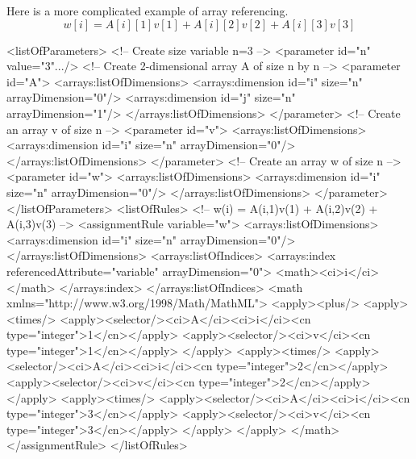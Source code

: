 Here is a more complicated example of array referencing.
\begin{displaymath}
w[i]= A[i][1]v[1]+ A[i][2]v[2]+ A[i][3]v[3]
\end{displaymath}

\begin{example}
<listOfParameters> 
 <!-- Create size variable n=3 -->
 <parameter id="n" value="3".../>
 <!-- Create 2-dimensional array A of size n by n -->
 <parameter id="A">
  <arrays:listOfDimensions>
   <arrays:dimension id="i" size="n" arrayDimension="0"/> 
   <arrays:dimension id="j" size="n" arrayDimension="1"/>
  </arrays:listOfDimensions> 
 </parameter> 
 <!-- Create an array v of size n -->
 <parameter id="v">
  <arrays:listOfDimensions>
   <arrays:dimension id="i" size="n" arrayDimension="0"/>
  </arrays:listOfDimensions> 
 </parameter> 
 <!-- Create an array w of size n -->
 <parameter id="w">
  <arrays:listOfDimensions>
   <arrays:dimension id="i" size="n" arrayDimension="0"/>
  </arrays:listOfDimensions> 
 </parameter>
</listOfParameters>
<listOfRules>
 <!-- w(i) = A(i,1)v(1) + A(i,2)v(2) + A(i,3)v(3) -->
 <assignmentRule variable="w">
  <arrays:listOfDimensions>
   <arrays:dimension id="i" size="n" arrayDimension="0"/>
  </arrays:listOfDimensions> 
  <arrays:listOfIndices>
   <arrays:index referencedAttribute="variable" arrayDimension="0">
    <math><ci>i</ci></math>
   </arrays:index>
  </arrays:listOfIndices>
  <math xmlns="http://www.w3.org/1998/Math/MathML">
   <apply><plus/>
    <apply><times/>
     <apply><selector/><ci>A</ci><ci>i</ci><cn type="integer">1</cn></apply>
     <apply><selector/><ci>v</ci><cn type="integer">1</cn></apply>
    </apply>
    <apply><times/>
     <apply><selector/><ci>A</ci><ci>i</ci><cn type="integer">2</cn></apply>
     <apply><selector/><ci>v</ci><cn type="integer">2</cn></apply>
    </apply>
    <apply><times/>
     <apply><selector/><ci>A</ci><ci>i</ci><cn type="integer">3</cn></apply>
     <apply><selector/><ci>v</ci><cn type="integer">3</cn></apply>
    </apply>
   </apply>
  </math>
 </assignmentRule>
</listOfRules>
\end{example}



